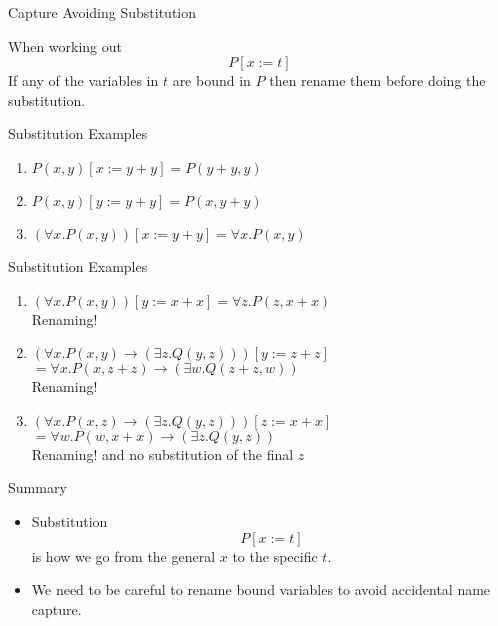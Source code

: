 \documentclass[xetex,aspectratio=169,14pt,hyperref={pdfpagelabels=true,pdflang={en-GB}}]{beamer}
\begin{document}
\begin{frame}
  {Capture Avoiding Substitution}

  When working out
  \begin{displaymath}
    P[x := t]
  \end{displaymath}
  If any of the variables in $t$ are bound in $P$ then rename them
  before doing the substitution.
\end{frame}

\begin{frame}
  {Substitution Examples}

  \begin{enumerate}
  \item $P(x,y)[x:=y+y]$\pause \quad $= P(y+y,y)$
    \pause
    \bigskip
  \item $P(x,y)[y:=y+y]$\pause \quad $= P(x,y+y)$
    \pause
    \bigskip
  \item $(\forall x. P(x,y))[x:=y+y]$\pause \quad $= \forall x. P(x,y)$
  \end{enumerate}
\end{frame}


\begin{frame}
  {Substitution Examples}

  \begin{enumerate}
  \item $(\forall x. P(x,y))[y:=x+x]$\pause \quad $= \forall z. P(z,x+x)$ \\
    \qquad \textcolor{black!60}{Renaming!}
    \pause
    \bigskip
  \item $(\forall x. P(x,y) \to (\exists z. Q(y,z)))[y:=z+z]$\pause\\
    $= \forall x. P(x,z+z) \to (\exists w. Q(z+z,w))$\\
    \qquad \textcolor{black!60}{Renaming!}
    \pause
    \bigskip
  \item $(\forall x. P(x,z) \to (\exists z. Q(y,z)))[z:=x+x]$\pause\\
    $= \forall w. P(w,x+x) \to (\exists z. Q(y,z))$\\
    \qquad \textcolor{black!60}{Renaming! and no substitution of the final $z$}
  \end{enumerate}
\end{frame}

\begin{frame}
  {Summary}

  \begin{itemize}
  \item Substitution
    \begin{displaymath}
      P [x := t]
    \end{displaymath}
    is how we go from the general $x$ to the specific $t$.
  \item We need to be careful to rename bound variables to avoid
    accidental name capture.
  \end{itemize}
\end{frame}
\end{document}
